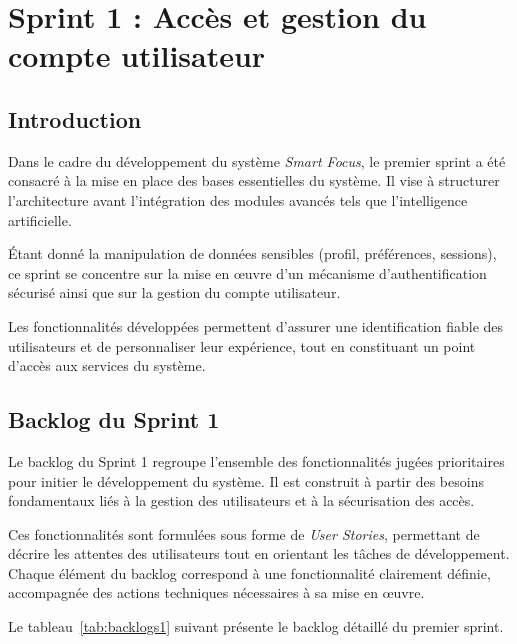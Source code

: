 \chapter{Sprint 1 : Accès et gestion du compte utilisateur}
\label{chap:sprint1}

\section{Introduction}

Dans le cadre du développement du système \textit{Smart Focus}, le premier sprint a été consacré à la mise en place des bases essentielles du système. Il vise à structurer l’architecture avant l’intégration des modules avancés tels que l’intelligence artificielle.

Étant donné la manipulation de données sensibles (profil, préférences, sessions), ce sprint se concentre sur la mise en œuvre d’un mécanisme d’authentification sécurisé ainsi que sur la gestion du compte utilisateur.

Les fonctionnalités développées permettent d’assurer une identification fiable des utilisateurs et de personnaliser leur expérience, tout en constituant un point d’accès aux services du système.

\section{Backlog du Sprint 1}

Le backlog du Sprint 1 regroupe l’ensemble des fonctionnalités jugées prioritaires pour initier le développement du système. Il est construit à partir des besoins fondamentaux liés à la gestion des utilisateurs et à la sécurisation des accès.

Ces fonctionnalités sont formulées sous forme de \textit{User Stories}, permettant de décrire les attentes des utilisateurs tout en orientant les tâches de développement. Chaque élément du backlog correspond à une fonctionnalité clairement définie, accompagnée des actions techniques nécessaires à sa mise en œuvre.

Le tableau~\ref{tab:backlogs1} suivant présente le backlog détaillé du premier sprint.

